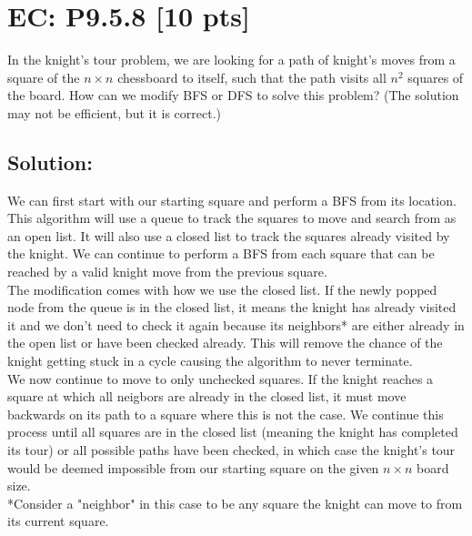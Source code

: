 \documentclass[12pt]{article}
\begin{document}
\newpage
\section*{\textbf{EC: P9.5.8} [10 pts]}
In the knight’s tour problem, we are looking for a path of knight’s moves from a square of the $n \times n$ chessboard to itself, such that the path visits all $n^2$ squares of the board. How can we modify BFS or DFS to solve this problem? (The solution may not be efficient, but it is correct.)


\subsection*{\textbf{Solution:}}
We can first start with our starting square and perform a BFS from its location. This algorithm will use a queue to track the squares to move and search from as an open list. It will also use a closed list to track the squares already visited by the knight. We can continue to perform a BFS from each square that can be reached by a valid knight move from the previous square.\\

\noindent
The modification comes with how we use the closed list. If the newly popped node from the queue is in the closed list, it means the knight has already visited it and we don't need to check it again because its neighbors* are either already in the open list or have been checked already. This will remove the chance of the knight getting stuck in a cycle causing the algorithm to never terminate.\\

\noindent
We now continue to move to only unchecked squares. If the knight reaches a square at which all neigbors are already in the closed list, it must move backwards on its path to a square where this is not the case. We continue this process until all squares are in the closed list (meaning the knight has completed its tour) or all possible paths have been checked, in which case the knight's tour would be deemed impossible from our starting square on the given $n \times n$ board size.\\

*Consider a "neighbor" in this case to be any square the knight can move to from its current square.
\end{document}
